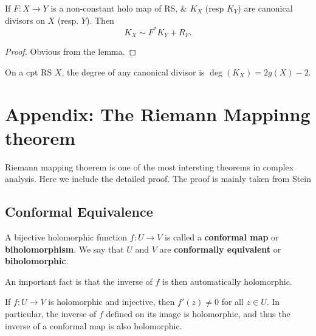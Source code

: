 \documentclass{article}
\begin{document}
\begin{corollary}
    If $F: X \to Y$ is a non-constant holo map of RS, \& $K_X$ (resp $K_Y$) are canonical divisors on $X$ (resp. $Y$). Then
    \[
    K_X \sim F^* K_Y + R_F.
    \]
\end{corollary}
\begin{proof}
    Obvious from the lemma.
\end{proof}

\begin{proposition}
    On a cpt RS $X$, the degree of any canonical divisor is $\deg(K_X) = 2g(X) - 2$.
\end{proposition}

\newpage
\appendix
\section{Appendix: The Riemann Mappinng theorem}
Riemann mapping thoerem is one of the most intersting theorems in complex analysis. Here we include the detailed proof. The proof is mainly taken from Stein

\subsection*{Conformal Equivalence}

\begin{definition}
A bijective holomorphic function $f: U \to V$ is called a \textbf{conformal map} or \textbf{biholomorphism}. We say that $U$ and $V$ are \textbf{conformally equivalent} or \textbf{biholomorphic}.
\end{definition}

An important fact is that the inverse of $f$ is then automatically holomorphic.

\begin{proposition}
If $f: U \to V$ is holomorphic and injective, then $f'(z) \ne 0$ for all $z \in U$. In particular, the inverse of $f$ defined on its image is holomorphic, and thus the inverse of a conformal map is also holomorphic.
\end{proposition}
\end{document}
